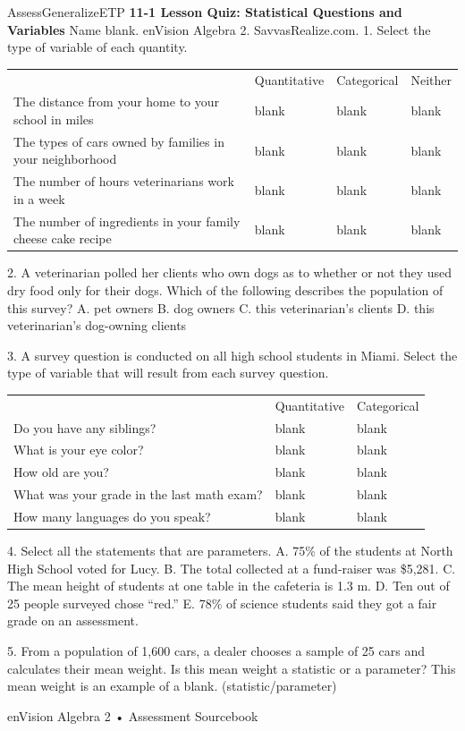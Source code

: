 \documentclass{article}
\newenvironment{te-addendum}[2]{}{}     %
\newcommand{\answer}[1]{}               %
\begin{document}
\begin{te-addendum}{Assess}{GeneralizeETP}
\textbf{11-1 Lesson Quiz: Statistical Questions and Variables}
Name blank. enVision Algebra 2. SavvasRealize.com.
1. Select the type of variable of each quantity.
\begin{tabular}{llll}
 & Quantitative & Categorical & Neither \\
The distance from your home to your school in miles & blank & blank & blank \\
The types of cars owned by families in your neighborhood & blank & blank & blank \\
The number of hours veterinarians work in a week & blank & blank & blank \\
The number of ingredients in your family cheese cake recipe & blank & blank & blank \\
\end{tabular}
\answer{1. Neither; Categorical; Quantitative; Neither.}
2. A veterinarian polled her clients who own dogs as to whether or not they used dry food only for their dogs. Which of the following describes the population of this survey?
A. pet owners
B. dog owners
C. this veterinarian's clients
D. this veterinarian's dog-owning clients
\answer{2. D}
3. A survey question is conducted on all high school students in Miami. Select the type of variable that will result from each survey question.
\begin{tabular}{lll}
 & Quantitative & Categorical \\
Do you have any siblings? & blank & blank \\
What is your eye color? & blank & blank \\
How old are you? & blank & blank \\
What was your grade in the last math exam? & blank & blank \\
How many languages do you speak? & blank & blank \\
\end{tabular}
\answer{3. Categorical; Categorical; Quantitative; Quantitative; Quantitative.}
4. Select all the statements that are parameters.
A. 75\% of the students at North High School voted for Lucy.
B. The total collected at a fund-raiser was \$5,281.
C. The mean height of students at one table in the cafeteria is 1.3 m.
D. Ten out of 25 people surveyed chose ``red.''
E. 78\% of science students said they got a fair grade on an assessment.
\answer{4. A, B, E}
5. From a population of 1,600 cars, a dealer chooses a sample of 25 cars and calculates their mean weight. Is this mean weight a statistic or a parameter?
This mean weight is an example of a blank. (statistic/parameter)
\answer{5. statistic}
enVision Algebra 2 • Assessment Sourcebook
\end{te-addendum}
\end{document}
